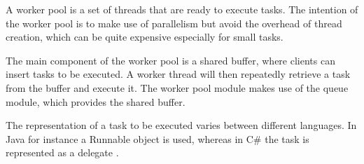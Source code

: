 \documentclass[a4paper,10pt]{article}
\begin{document}
% 
% 
% 
% 
% 
% 

A worker pool is a set of threads that are ready to execute tasks.
The intention of the worker pool is to make use of parallelism but avoid the overhead of thread creation, which can be quite expensive especially for small tasks.

The main component of the worker pool is a shared buffer, where clients can insert tasks to be executed.
A worker thread will then repeatedly retrieve a task from the buffer and execute it.
The worker pool module makes use of the queue module, which provides the shared buffer.


The representation of a task to be executed varies between different languages.
In Java for instance a Runnable  object is used, whereas in C\# the task is represented as a delegate .
\end{document}
